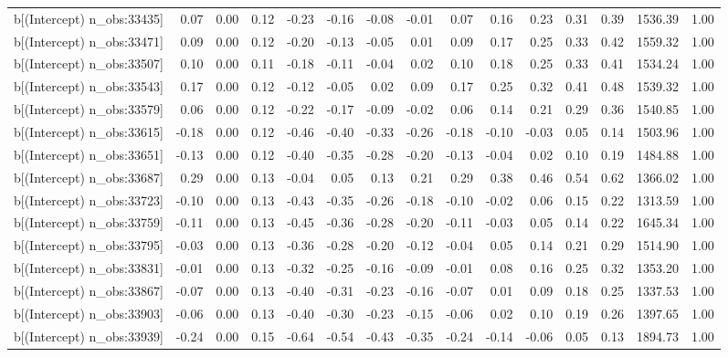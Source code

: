 \begin{table}[ht]
\begin{tabular}{rrrrrrrrrrrrrrr}
  b[(Intercept) n\_obs:33435] & 0.07 & 0.00 & 0.12 & -0.23 & -0.16 & -0.08 & -0.01 & 0.07 & 0.16 & 0.23 & 0.31 & 0.39 & 1536.39 & 1.00 \\ 
  b[(Intercept) n\_obs:33471] & 0.09 & 0.00 & 0.12 & -0.20 & -0.13 & -0.05 & 0.01 & 0.09 & 0.17 & 0.25 & 0.33 & 0.42 & 1559.32 & 1.00 \\ 
  b[(Intercept) n\_obs:33507] & 0.10 & 0.00 & 0.11 & -0.18 & -0.11 & -0.04 & 0.02 & 0.10 & 0.18 & 0.25 & 0.33 & 0.41 & 1534.24 & 1.00 \\ 
  b[(Intercept) n\_obs:33543] & 0.17 & 0.00 & 0.12 & -0.12 & -0.05 & 0.02 & 0.09 & 0.17 & 0.25 & 0.32 & 0.41 & 0.48 & 1539.32 & 1.00 \\ 
  b[(Intercept) n\_obs:33579] & 0.06 & 0.00 & 0.12 & -0.22 & -0.17 & -0.09 & -0.02 & 0.06 & 0.14 & 0.21 & 0.29 & 0.36 & 1540.85 & 1.00 \\ 
  b[(Intercept) n\_obs:33615] & -0.18 & 0.00 & 0.12 & -0.46 & -0.40 & -0.33 & -0.26 & -0.18 & -0.10 & -0.03 & 0.05 & 0.14 & 1503.96 & 1.00 \\ 
  b[(Intercept) n\_obs:33651] & -0.13 & 0.00 & 0.12 & -0.40 & -0.35 & -0.28 & -0.20 & -0.13 & -0.04 & 0.02 & 0.10 & 0.19 & 1484.88 & 1.00 \\ 
  b[(Intercept) n\_obs:33687] & 0.29 & 0.00 & 0.13 & -0.04 & 0.05 & 0.13 & 0.21 & 0.29 & 0.38 & 0.46 & 0.54 & 0.62 & 1366.02 & 1.00 \\ 
  b[(Intercept) n\_obs:33723] & -0.10 & 0.00 & 0.13 & -0.43 & -0.35 & -0.26 & -0.18 & -0.10 & -0.02 & 0.06 & 0.15 & 0.22 & 1313.59 & 1.00 \\ 
  b[(Intercept) n\_obs:33759] & -0.11 & 0.00 & 0.13 & -0.45 & -0.36 & -0.28 & -0.20 & -0.11 & -0.03 & 0.05 & 0.14 & 0.22 & 1645.34 & 1.00 \\ 
  b[(Intercept) n\_obs:33795] & -0.03 & 0.00 & 0.13 & -0.36 & -0.28 & -0.20 & -0.12 & -0.04 & 0.05 & 0.14 & 0.21 & 0.29 & 1514.90 & 1.00 \\ 
  b[(Intercept) n\_obs:33831] & -0.01 & 0.00 & 0.13 & -0.32 & -0.25 & -0.16 & -0.09 & -0.01 & 0.08 & 0.16 & 0.25 & 0.32 & 1353.20 & 1.00 \\ 
  b[(Intercept) n\_obs:33867] & -0.07 & 0.00 & 0.13 & -0.40 & -0.31 & -0.23 & -0.16 & -0.07 & 0.01 & 0.09 & 0.18 & 0.25 & 1337.53 & 1.00 \\ 
  b[(Intercept) n\_obs:33903] & -0.06 & 0.00 & 0.13 & -0.40 & -0.30 & -0.23 & -0.15 & -0.06 & 0.02 & 0.10 & 0.19 & 0.26 & 1397.65 & 1.00 \\ 
  b[(Intercept) n\_obs:33939] & -0.24 & 0.00 & 0.15 & -0.64 & -0.54 & -0.43 & -0.35 & -0.24 & -0.14 & -0.06 & 0.05 & 0.13 & 1894.73 & 1.00 \\ 

\end{tabular}
\end{table}
